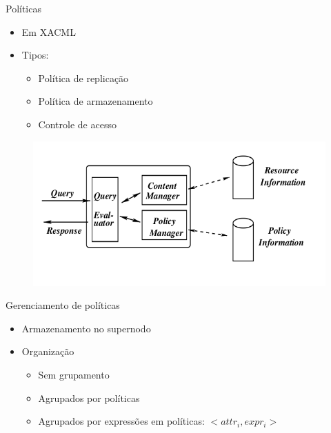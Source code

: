 \documentclass{beamer}
\begin{document}
  \begin{frame}{Políticas}
   \begin{itemize}
    \item Em XACML
    \item Tipos:
    \begin{itemize}
     \item Política de replicação
     \item Política de armazenamento
     \item Controle de acesso
    \end{itemize}
   \end{itemize}
   \begin{figure}[H]
    \includegraphics[scale=0.25]{phera_fig2.png}
   \end{figure}

  \end{frame}
  
  \begin{frame}{Gerenciamento de políticas}
   \begin{itemize}
    \item Armazenamento no supernodo
    \item Organização
    \begin{itemize}
     \item Sem grupamento
     \item Agrupados por políticas
     \item Agrupados por expressões em políticas: $< attr_{i}, expr_{i} >$
    \end{itemize}

   \end{itemize}
  \end{frame}
  
\end{document}

